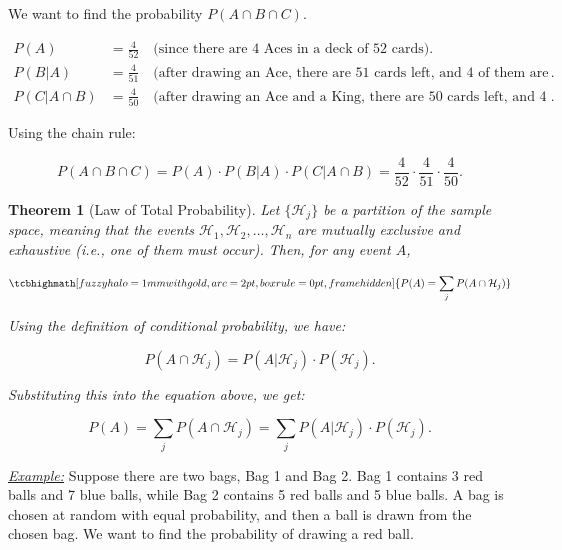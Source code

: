 \documentclass[a4paper,10pt]{article}
\newtheorem{theorem}{Theorem}
\newcommand{\equationgold}[1]{
  \tcbhighmath[fuzzy halo=1mm with gold,arc=2pt,boxrule=0pt,frame hidden]{#1}
}
\newcommand{\hlti}[1]{\colorbox{color1}{#1}}
\begin{document}
We want to find the probability \( P(A \cap B \cap C) \).

\begin{align*}
    P(A) &= \frac{4}{52} \quad \text{(since there are 4 Aces in a deck of 52 cards)}. \\
    P(B | A) &= \frac{4}{51} \quad \text{(after drawing an Ace, there are 51 cards left, and 4 of them are Kings)}. \\
    P(C | A \cap B) &= \frac{4}{50} \quad \text{(after drawing an Ace and a King, there are 50 cards left, and 4 of them are Queens)}.
\end{align*}

Using the chain rule:

\[
P(A \cap B \cap C) = P(A) \cdot P(B | A) \cdot P(C | A \cap B) = \frac{4}{52} \cdot \frac{4}{51} \cdot \frac{4}{50}.
\]


\begin{theorem}[\hlti{Law of Total Probability}]
    Let $\{\mathcal{H}_j\}$ be a partition of the sample space, meaning that the events $\mathcal{H}_1, \mathcal{H}_2, \ldots, \mathcal{H}_n$ are mutually exclusive and exhaustive (i.e., one of them must occur). Then, for any event $A$,

    \begin{equation}
    \equationgold{
      P(A) = \sum_j P(A \cap \mathcal{H}_j)
    }
    \end{equation}

    Using the definition of conditional probability, we have:

    \begin{equation}
        P(A \cap \mathcal{H}_j) = P(A | \mathcal{H}_j) \cdot P(\mathcal{H}_j).
    \end{equation}

    Substituting this into the equation above, we get:

    \begin{equation}
        P(A) = \sum_j P(A \cap \mathcal{H}_j) = \sum_j P(A | \mathcal{H}_j) \cdot P(\mathcal{H}_j).
    \end{equation}
\end{theorem}

\noindent\textit{\underline{Example:}} Suppose there are two bags, Bag 1 and Bag 2. Bag 1 contains 3 red balls and 7 blue balls, while Bag 2 contains 5 red balls and 5 blue balls. A bag is chosen at random with equal probability, and then a ball is drawn from the chosen bag. We want to find the probability of drawing a red ball.
\end{document}
